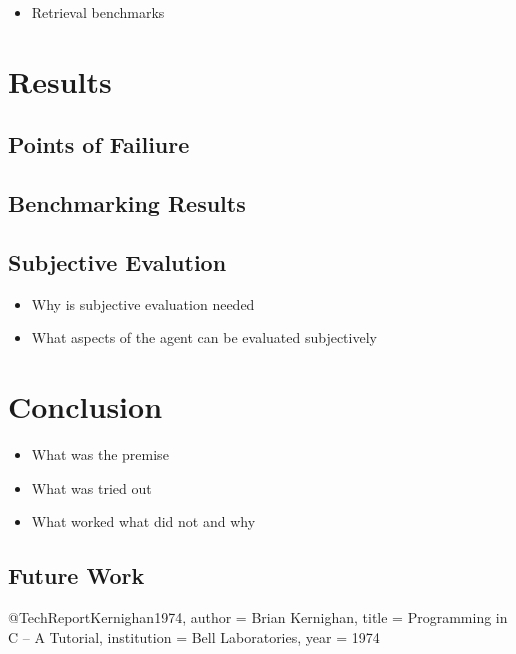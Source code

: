 \documentclass[english, version-2022-01]{uzl-thesis}
\begin{document}
\begin{itemize}
	\item Retrieval benchmarks
\end{itemize}

\chapter{Results}

\section{Points of Failiure}

\section{Benchmarking Results}

\section{Subjective Evalution}

\begin{itemize}
	\item Why is subjective evaluation needed
	\item What aspects of the agent can be evaluated subjectively
\end{itemize}

\chapter{Conclusion}

\begin{itemize}
	\item What was the premise
	\item What was tried out
	\item What worked what did not and why
\end{itemize}

\section{Future Work}

\begin{bibtex-entries}
@TechReport{Kernighan1974,
	author = {Brian Kernighan},
	title = {Programming in C – A Tutorial},
	institution = {Bell Laboratories},
	year = {1974}
}
\end{bibtex-entries}
\end{document}
